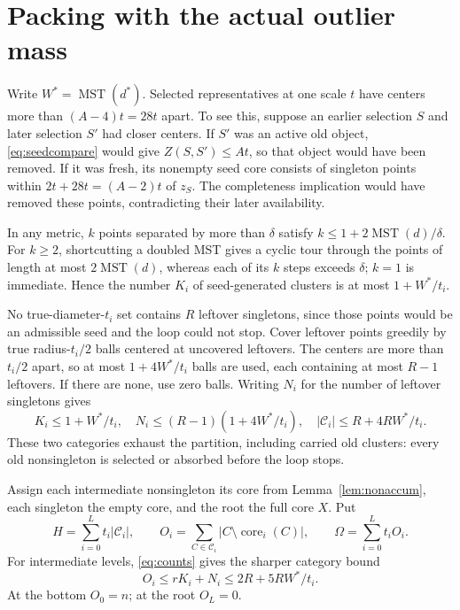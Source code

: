 \documentclass[acmsmall,11pt,nonacm]{acmart}
\theoremstyle{definition}
\newcommand{\MST}{\operatorname{MST}}
\newcommand{\calC}{\mathcal C}
\newcommand{\core}{\operatorname{core}}
\begin{document}
\section{Packing with the actual outlier mass}\label{sec:packing}

Write $W^*=\MST(d^*)$. Selected representatives at one scale $t$ have
centers more than $(A-4)t=28t$ apart. To see this, suppose an earlier
selection $S$ and later selection $S'$ had closer centers. If $S'$ was an
active old object, \eqref{eq:seedcompare} would give $Z(S,S')\leq At$,
so that object would have been removed. If it was fresh, its nonempty
seed core consists of singleton points within $2t+28t=(A-2)t$ of $z_S$.
The completeness implication would have removed these points, contradicting
their later availability.

In any metric, $k$ points separated by more than $\delta$ satisfy
$k\leq1+2\MST(d)/\delta$. For $k\geq2$, shortcutting a doubled MST
gives a cyclic tour through the points of length at most $2\MST(d)$,
whereas each of its $k$ steps exceeds $\delta$; $k=1$ is immediate.
Hence the number $K_i$ of seed-generated clusters is at most
$1+W^*/t_i$.

No true-diameter-$t_i$ set contains $R$ leftover singletons, since those
points would be an admissible seed and the loop could not stop. Cover
leftover points greedily by true radius-$t_i/2$ balls centered at uncovered
leftovers. The centers are more than $t_i/2$ apart, so at most
$1+4W^*/t_i$ balls are used, each containing at most $R-1$ leftovers.
If there are none, use zero balls. Writing $N_i$ for the number of leftover
singletons gives
\begin{equation}\label{eq:counts}
 K_i\leq1+W^*/t_i,\quad N_i\leq(R-1)(1+4W^*/t_i),\quad
 |\calC_i|\leq R+4RW^*/t_i.
\end{equation}
These two categories exhaust the partition, including carried old clusters:
every old nonsingleton is selected or absorbed before the loop stops.

Assign each intermediate nonsingleton its core from
Lemma~\ref{lem:nonaccum}, each singleton the empty core, and the root the
full core $X$. Put
\[
 H=\sum_{i=0}^L t_i|\calC_i|,\qquad
 O_i=\sum_{C\in\calC_i}|C\setminus\core_i(C)|,\qquad
 \Omega=\sum_{i=0}^L t_i O_i.
\]
For intermediate levels, \eqref{eq:counts} gives the sharper category bound
\begin{equation}\label{eq:outliers}
 O_i\leq rK_i+N_i\leq2R+5RW^*/t_i.
\end{equation}
At the bottom $O_0=n$; at the root $O_L=0$.
\end{document}
